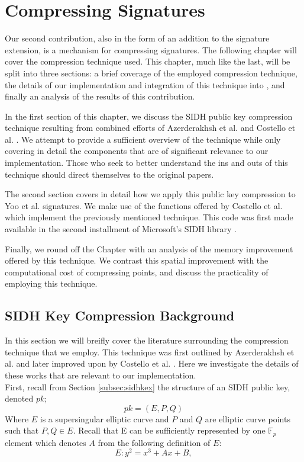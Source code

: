 \chapter{Compressing Signatures}
\label{sec:compress}

Our second contribution, also in the form of an addition to the \sidh signature extension, is a mechanism for compressing signatures. The following chapter will cover the compression technique used. This chapter, much like the last, will be split into three sections: a brief coverage of the employed compression technique, the details of our implementation and integration of this technique into \sidh, and finally an analysis of the results of this contribution.

In the first section of this chapter, we discuss the SIDH public key compression technique resulting from combined efforts of Azerderakhsh et al. \cite{compwr} and Costello et al. \cite{pkcomp}. We attempt to provide a sufficient overview of the technique while only covering in detail the components that are of significant relevance to our implementation. Those who seek to better understand the ins and outs of this technique should direct themselves to the original papers.  

The second section covers in detail how we apply this public key compression to Yoo et al. signatures. We make use of the functions offered by Costello et al. which implement the previously mentioned technique. This code was first made available in the second installment of Microsoft's SIDH library \cite{sidhcode}.

Finally, we round off the Chapter with an analysis of the memory improvement offered by this technique. We contrast this spatial improvement with the computational cost of compressing points, and discuss the practicality of employing this technique. 

\section{SIDH Key Compression Background}

In this section we will breifly cover the literature surrounding the compression technique that we employ. This technique was first outlined by Azerderakhsh et al. \cite{compwr} and later improved upon by Costello et al. \cite{pkcomp}. Here we investigate the details of these works that are relevant to our implementation.\\

\noindent
First, recall from Section \ref{subsec:sidhkex} the structure of an SIDH public key, denoted $pk$;
$$
pk = (E, P, Q)
$$
Where $E$ is a supersingular elliptic curve and $P$ and $Q$ are elliptic curve points such that $P, Q \in E$. Recall that E can be sufficiently represented by one $\mathbb{F}_{p}$ element which denotes $A$ from the following definition of $E$:
$$
E : y^2 = x^3 + Ax + B,
$$

